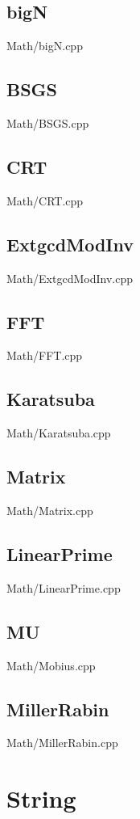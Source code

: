    \subsection{bigN}
         {Math/bigN.cpp}
    \subsection{BSGS}
         {Math/BSGS.cpp}
    \subsection{CRT}
         {Math/CRT.cpp}
    \subsection{ExtgcdModInv}
         {Math/ExtgcdModInv.cpp}
    \subsection{FFT}
         {Math/FFT.cpp}
    \subsection{Karatsuba}
         {Math/Karatsuba.cpp}
    \subsection{Matrix}
         {Math/Matrix.cpp}
    \subsection{LinearPrime}
         {Math/LinearPrime.cpp}
    \subsection{MU}
         {Math/Mobius.cpp}
    \subsection{MillerRabin}
         {Math/MillerRabin.cpp}

\section{String}
